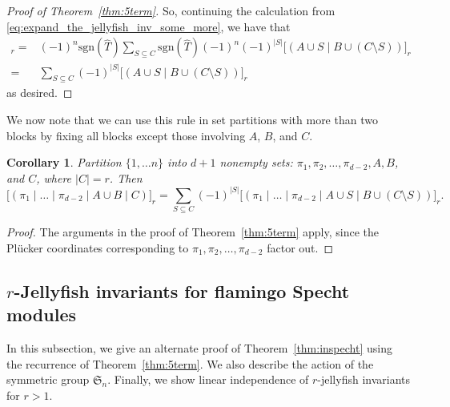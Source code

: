 \documentclass[10pt]{amsart}
\theoremstyle{definition}
\theoremstyle{plain}
\theoremstyle{plain}
\theoremstyle{definition}
\theoremstyle{remark}
\theoremstyle{plain}
\theoremstyle{plain}
\newtheorem{corollary}[cdrthm]{Corollary}
\theoremstyle{plain}
\numberwithin{equation}{section}
\newcommand{\sgn}{\mathrm{sgn}}
\begin{document}
\begin{proof}[Proof of Theorem~\ref{thm:5term}]
So, continuing the calculation from \eqref{eq:expand_the_jellyfish_inv_some_more}, we have that 
\begin{align*}
   [(A\cup B \ | \ C)]_r =& (-1)^n\sgn(\widehat{T})\sum_{S\subseteq C}\sgn(\widehat{T})(-1)^n(-1)^{|S|}\big[( A\cup S \mid B\cup (C\setminus S) ) \big]_r \\
    =& \sum_{S\subseteq C}(-1)^{|S|}\big[( A\cup S \mid B\cup (C\setminus S) ) \big]_r
\end{align*}
as desired.
\end{proof}

We now note that we can use this rule in set partitions with more than two blocks by fixing all blocks except those involving $A$, $B$, and $C$.
\begin{corollary}\label{cor:twoblocks}
Partition $\{1,\ldots n\}$ into $d+1$ nonempty sets: $\pi_1,\pi_2,\ldots,\pi_{d-2}, A, B$, and $C$, where $|C|=r$. Then 
\begin{equation}
\label{eq:manyterm}
\big[(\pi_1 \mid \ldots \mid \pi_{d-2} \mid A\cup B \mid C)\big]_r=\sum_{S\subseteq C}(-1)^{|S|}\big[(\pi_1 \mid \ldots \mid \pi_{d-2} \mid A\cup S \mid B\cup (C\setminus S))\big]_r.
\end{equation}
\end{corollary}
\begin{proof}
The arguments in the proof of Theorem~\ref{thm:5term} apply, since the Pl\"ucker coordinates corresponding to $\pi_1,\pi_2,\ldots,\pi_{d-2}$ factor out.
\end{proof}


\subsection{\texorpdfstring{$r$}{r}-Jellyfish invariants for flamingo Specht modules}
\label{sec:rest}
In this subsection, we give an alternate proof of Theorem~\ref{thm:inspecht} using the recurrence of Theorem~\ref{thm:5term}. We also describe the action of the symmetric group $\mathfrak{S}_n$. Finally, we show linear independence of $r$-jellyfish invariants for $r>1$.
\end{document}
